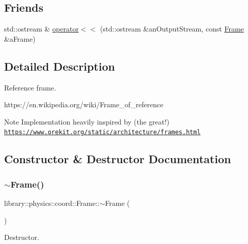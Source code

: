\subsection*{Friends}
\begin{DoxyCompactItemize}
\item 
std\+::ostream \& \hyperlink{classlibrary_1_1physics_1_1coord_1_1_frame_a509ac1926cfc3553748bace204e2b1cc}{operator$<$$<$} (std\+::ostream \&an\+Output\+Stream, const \hyperlink{classlibrary_1_1physics_1_1coord_1_1_frame}{Frame} \&a\+Frame)
\end{DoxyCompactItemize}


\subsection{Detailed Description}
Reference frame. 

https\+://en.wikipedia.\+org/wiki/\+Frame\+\_\+of\+\_\+reference \begin{DoxyNote}{Note}
Implementation heavily inspired by (the great!) \href{https://www.orekit.org/static/architecture/frames.html}{\tt https\+://www.\+orekit.\+org/static/architecture/frames.\+html} 
\end{DoxyNote}


\subsection{Constructor \& Destructor Documentation}
\mbox{\label{classlibrary_1_1physics_1_1coord_1_1_frame_a7a4b031eff12e290c0ccacb7d5a47dfd}} 
\subsubsection{\texorpdfstring{$\sim$\+Frame()}{~Frame()}}
{\footnotesize\ttfamily library\+::physics\+::coord\+::\+Frame\+::$\sim$\+Frame (\begin{DoxyParamCaption}{ }\end{DoxyParamCaption})}



Destructor. 

\mbox{\label{classlibrary_1_1physics_1_1coord_1_1_frame_a6a8410c8b29584fe2c2c78370c72f695}} 
